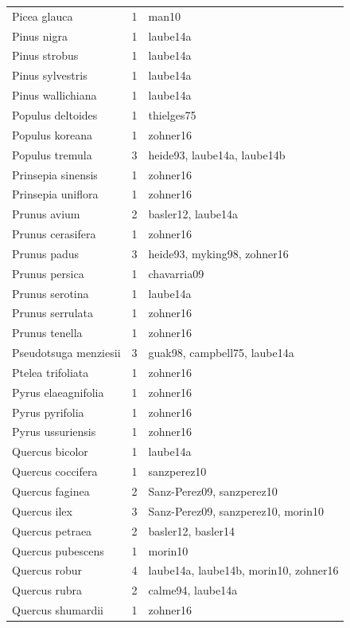 \documentclass{article}
\begin{document}
\begin{footnotesize}
\begin{longtable}{|p{}|p{}|p{}|}
  Picea glauca &   1 & man10 \\ 
  Pinus nigra &   1 & laube14a \\ 
  Pinus strobus &   1 & laube14a \\ 
  Pinus sylvestris &   1 & laube14a \\ 
  Pinus wallichiana &   1 & laube14a \\ 
  Populus deltoides &   1 & thielges75 \\ 
  Populus koreana &   1 & zohner16 \\ 
  Populus tremula &   3 & heide93, laube14a, laube14b \\ 
  Prinsepia sinensis &   1 & zohner16 \\ 
  Prinsepia uniflora &   1 & zohner16 \\ 
  Prunus avium &   2 & basler12, laube14a \\ 
  Prunus cerasifera &   1 & zohner16 \\ 
  Prunus padus &   3 & heide93, myking98, zohner16 \\ 
  Prunus persica &   1 & chavarria09 \\ 
  Prunus serotina &   1 & laube14a \\ 
  Prunus serrulata &   1 & zohner16 \\ 
  Prunus tenella &   1 & zohner16 \\ 
  Pseudotsuga menziesii &   3 & guak98, campbell75, laube14a \\ 
  Ptelea trifoliata &   1 & zohner16 \\ 
  Pyrus elaeagnifolia &   1 & zohner16 \\ 
  Pyrus pyrifolia &   1 & zohner16 \\ 
  Pyrus ussuriensis &   1 & zohner16 \\ 
  Quercus bicolor &   1 & laube14a \\ 
  Quercus coccifera &   1 & sanzperez10 \\ 
  Quercus faginea &   2 & Sanz-Perez09, sanzperez10 \\ 
  Quercus ilex &   3 & Sanz-Perez09, sanzperez10, morin10 \\ 
  Quercus petraea &   2 & basler12, basler14 \\ 
  Quercus pubescens &   1 & morin10 \\ 
  Quercus robur &   4 & laube14a, laube14b, morin10, zohner16 \\ 
  Quercus rubra &   2 & calme94, laube14a \\ 
  Quercus shumardii &   1 & zohner16 \\ 

\end{longtable}
\end{footnotesize}
\end{document}
